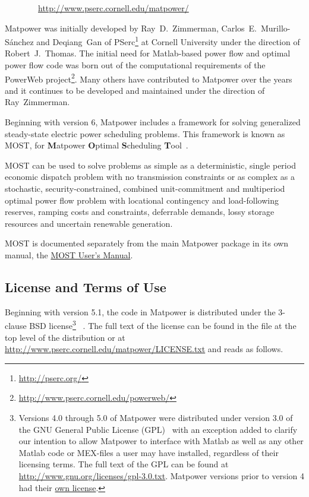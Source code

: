 \documentclass[12pt]{article}
\newcommand{\matlab}[0]{{\sc Matlab}}
\newcommand{\matpower}[0]{{\sc Matpower}}
\newcommand{\matpowerurl}[0]{http://www.pserc.cornell.edu/matpower/}
\newcommand{\most}[0]{{MOST}}
\newcommand{\mostname}[0]{{{\bf M}{\sc atpower} \textbf{O}ptimal \textbf{S}cheduling \textbf{T}ool}}
\newcommand{\mostver}[0]{1.0}
\newcommand{\pserc}[0]{{\sc PSerc}}
\newcommand{\code}[1]{{\relsize{-0.5}{\tt{{#1}}}}}  %
\newcommand{\mostmanurl}[0]{http://www.pserc.cornell.edu/matpower/docs/MOST-manual-\mostver.pdf}
\newcommand{\mostman}[0]{\href{\mostmanurl}{\most{} User's Manual}}
\numberwithin{equation}{section}
\numberwithin{table}{section}
\numberwithin{figure}{section}
\begin{document}
\bigskip

~~~~~~~~\url{\matpowerurl}

\bigskip

\matpower{} was initially developed by Ray~D.~Zimmerman, Carlos~E.~Murillo-S\'anchez and Deqiang~Gan of \pserc{}\footnote{\url{http://pserc.org/}} at Cornell University under the direction of Robert~J.~Thomas. The initial need for \matlab{}-based power flow and optimal power flow code was born out of the computational requirements of the PowerWeb project\footnote{\url{http://www.pserc.cornell.edu/powerweb/}}. Many others have contributed to \matpower{} over the years and it continues to be developed and maintained under the direction of Ray~Zimmerman.

Beginning with version 6, \matpower{} includes a framework for solving generalized steady-state electric power scheduling problems. This framework is known as \most{}, for \mostname{}~\cite{murillo-sanchez2013a}.

\most{} can be used to solve problems as simple as a deterministic, single period economic dispatch problem with no transmission constraints or as complex as a stochastic, security-constrained, combined unit-commitment and multiperiod optimal power flow problem with locational contingency and load-following reserves, ramping costs and constraints, deferrable demands, lossy storage resources and uncertain renewable generation.

\most{} is documented separately from the main \matpower{} package in its own manual, the \mostman{}.

\clearpage
\subsection{License and Terms of Use}

Beginning with version 5.1, the code in \matpower{} is distributed under the 3-clause BSD license\footnote{Versions 4.0 through 5.0 of \matpower{} were distributed under version 3.0 of the GNU General Public License (GPL)~\cite{gpl} with an exception added to clarify our intention to allow \matpower{} to interface with \matlab{} as well as any other \matlab{} code or MEX-files a user may have installed, regardless of their licensing terms. The full text of the GPL can be found at \url{http://www.gnu.org/licenses/gpl-3.0.txt}. \matpower{} versions prior to version 4 had their \href{http://www.pserc.cornell.edu/matpower/oldlicense.html}{own license}.}
~\cite{bsd}. The full text of the license can be found in the \code{LICENSE} file at the top level of the distribution or at \url{http://www.pserc.cornell.edu/matpower/LICENSE.txt} and reads as follows.
\end{document}

